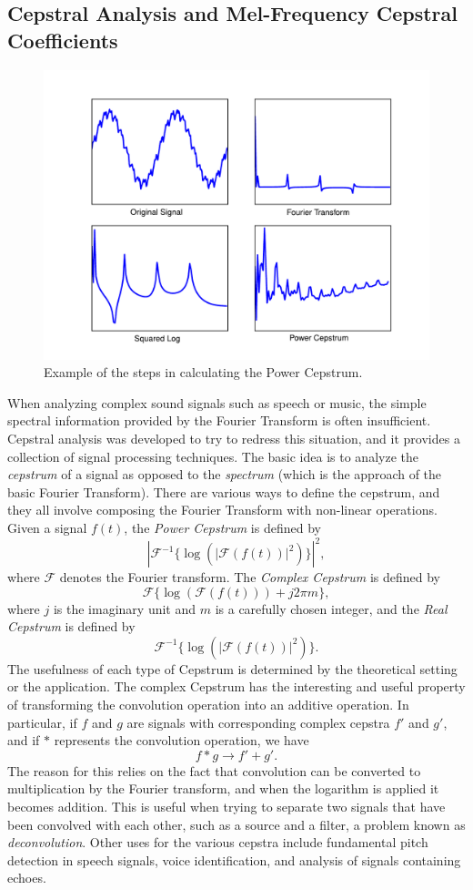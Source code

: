 \subsection*{Cepstral Analysis and Mel-Frequency Cepstral Coefficients}
\begin{figure}
\centering
\includegraphics[width=\textwidth]{PowerCepstrum.pdf}
\caption{Example of the steps in calculating the Power Cepstrum.}
\label{fourierext:pc}
\end{figure}
When analyzing complex sound signals such as speech or music, the simple spectral information provided by
the Fourier Transform is often insufficient. Cepstral analysis was developed to try to redress this
situation, and it provides a collection of signal processing techniques. The basic idea is to analyze the
\emph{cepstrum} of a signal as opposed to the \emph{spectrum} (which is the approach of the basic Fourier
Transform). There are various ways to define the cepstrum, and they all involve composing the Fourier
Transform with non-linear operations. Given a signal $f(t)$, the \emph{Power Cepstrum} is defined by
$$
\left|\mathcal{F}^{-1}\{\log(|\mathcal{F}(f(t))|^2)\}\right|^2,
$$
where $\mathcal{F}$ denotes the Fourier transform. The \emph{Complex Cepstrum} is defined by
$$
\mathcal{F}\{\log(\mathcal{F}(f(t)))+j2\pi m\},
$$
where $j$ is the imaginary unit and $m$ is a carefully chosen integer, and the \emph{Real Cepstrum}
is defined by
$$
\mathcal{F}^{-1}\{\log(|\mathcal{F}(f(t))|^2)\}.
$$
The usefulness of each type of Cepstrum is determined by the theoretical setting or the application.
The complex Cepstrum has the interesting and useful property of transforming the convolution operation
into an additive operation. In particular, if $f$ and $g$ are signals with corresponding complex
cepstra $f'$ and $g'$, and if $*$ represents the convolution operation, we have
$$
f * g \rightarrow f' + g'.
$$
The reason for this relies on the fact that convolution can be converted to multiplication by
the Fourier transform, and when the logarithm is applied it becomes addition.
This is useful when trying to separate two signals that have been convolved with each other, such as
a source and a filter, a problem known as \emph{deconvolution}.
Other uses for the various cepstra include fundamental pitch detection in speech signals, voice
identification, and analysis of signals containing echoes.

